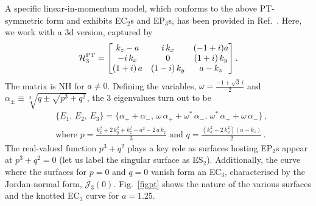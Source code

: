 \documentclass[aps, prb, onecolumn, nofootinbib, citeautoscript, 10pt]{revtex4-2}
\def \nn{\nonumber \\}
\begin{document}
A specific linear-in-momentum model, which conforms to the above PT-symmetric form and exhibits EC$_2$s and EP$_3$s, has been provided in Ref.~\cite{ips-emil}. Here, we work with a 3d version, captured by
\begin{align}
\label{eqpt}
\mathcal H^{\rm PT}_3= \begin{bmatrix}
k_z-a & i\, k_x & (-1+i) a \\
 -i \,k_x & 0 & (1+i)\, k_y \\
 (1+i)\, a & (1-i)\, k_y & a-k_z \\
\end{bmatrix}.
\end{align}
The matrix is NH for $a \neq 0 $. Defining the variables, $\omega = \frac{-1+\sqrt{3} \,i}{2} $ and
$\alpha_\pm  \equiv \sqrt[3]{ q \pm \sqrt{ p^3+ q^2}}$, the 3 eigenvalues turn out to be
\begin{align}
\label{eqPTev}
& \lbrace E_1, \, E_2,\, E_3 \rbrace  = 
\lbrace\alpha_+ +\alpha_-  , \, \omega \, \alpha_+ +  \omega^*  \, \alpha_- ,
\, \omega^* \, \alpha_+ +  \omega  \, \alpha_- \rbrace\,,\nn
& \text{where } p = \frac{ k_x^2+2 \,k_y^2+k_z^2-a^2-2 \,a\, k_z} {3} \text{ and }
q =  \frac{  \left(k_x^2-2\, k_y^2\right)\left(a-k_z\right) } {2} \,.
\end{align}
The real-valued function $p^3 + q^2$ plays a key role as surfaces hosting EP$_2$s appear at $p^3 + q^2 = 0$ (let us label the singular surface as ES$_2$). Additionally, the curve where the surfaces for $p = 0$ and $q =0$ vanish form an EC$_3$, characterised by the Jordan-normal form, $ \mathcal {J}_3 (0) $. Fig.~\ref{figpt} shows the nature of the various surfaces and the knotted EC$_3$ curve for $a=1.25$.
\end{document}
